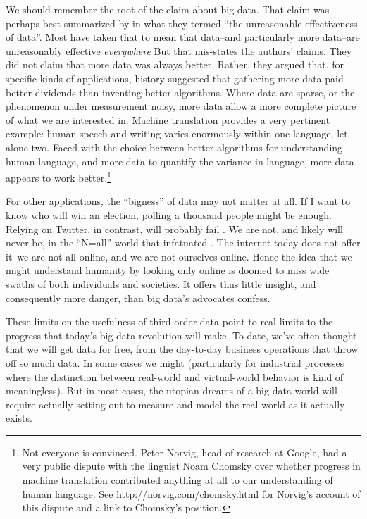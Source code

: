 \documentclass[12pt]{article}
\begin{document}
We should remember the root of the claim about big data. That claim
was perhaps best summarized by \cite{halevy2009unreasonable} in what
they termed ``the unreasonable effectiveness of data''. Most have
taken that to mean that data--and particularly more data--are
unreasonably effective \textit{everywhere} But that mis-states the authors'
claims. They did not claim that more data was always better. Rather,
they argued that, for specific kinds
of applications, history suggested that gathering more data paid better
dividends than inventing better algorithms. Where data are sparse, or
the phenomenon under measurement noisy, more data allow a more
complete picture of what we are interested in. Machine translation
provides a very pertinent example: human speech and writing varies
enormously within one language, let alone two. Faced with the choice
between better algorithms for understanding human language, and more
data to quantify the variance in language, more data appears to work
better.\footnote{Not everyone is convinced. Peter Norvig, head of
  research at Google, had a very public dispute with the linguist Noam
Chomsky over whether progress in machine translation contributed
anything at all to our understanding of human language. See
\url{http://norvig.com/chomsky.html} for Norvig's account of this
dispute and a link to Chomsky's position.} 

For other applications, the ``bigness'' of data may not matter at
all. If I want to know who will win an election, polling a thousand
people might be enough. Relying on Twitter, in contrast, will probably
fail \citep{gayo2011limits,gayo2012wanted,huberty2013}. We are not,
and likely will never be, in the ``N=all'' world that infatuated
\cite{mayer2013big}. The internet today does not offer it--we are not
all online, and we are not ourselves online. Hence the idea that we
might understand humanity by looking only online is doomed to miss
wide swaths of both individuals and societies. It offers thus little
insight, and consequently more danger, than big data's advocates confess.

These limits on the usefulness of third-order data point to real
limits to the progress that today's big data revolution will make. To
date, we've often thought that we will get data for free, from the
day-to-day business operations that throw off so much data. In some
cases we might (particularly for industrial processes where the
distinction between real-world and virtual-world behavior is kind of
meaningless). But in most cases, the utopian dreams of a big data
world will require actually setting out to measure and model the real
world as it actually exists. 
\end{document}
